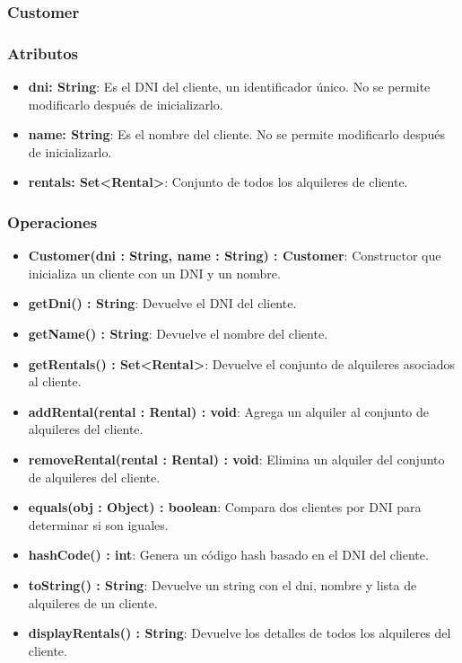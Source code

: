 \subsubsection{Customer}

\subsubsection*{Atributos}

\begin{itemize}
    \item \textbf{dni: String}: Es el DNI del cliente, un identificador único. No se permite modificarlo después de inicializarlo.
    \item \textbf{name: String}: Es el nombre del cliente. No se permite modificarlo después de inicializarlo.
    \item \textbf{rentals: Set<Rental>}: Conjunto de todos los alquileres de cliente.
\end{itemize}

\subsubsection*{Operaciones}

\begin{itemize}
    \item \textbf{Customer(dni : String, name : String) : Customer}: Constructor que inicializa un cliente con un DNI y un nombre.
    \item \textbf{getDni() : String}: Devuelve el DNI del cliente.
    \item \textbf{getName() : String}: Devuelve el nombre del cliente.
    \item \textbf{getRentals() : Set<Rental>}: Devuelve el conjunto de alquileres asociados al cliente.
    \item \textbf{addRental(rental : Rental) : void}: Agrega un alquiler al conjunto de alquileres del cliente.
    \item \textbf{removeRental(rental : Rental) : void}: Elimina un alquiler del conjunto de alquileres del cliente.
    \item \textbf{equals(obj : Object) : boolean}: Compara dos clientes por DNI para determinar si son iguales.
    \item \textbf{hashCode() : int}: Genera un código hash basado en el DNI del cliente.
    \item \textbf{toString() : String}: Devuelve un string con el dni, nombre y lista de alquileres de un cliente.
    \item \textbf{displayRentals() : String}: Devuelve los detalles de todos los alquileres del cliente.
\end{itemize}



